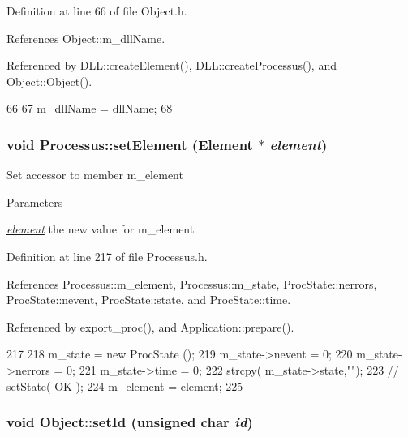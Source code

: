 Definition at line 66 of file Object.h.

References Object::m\_\-dllName.

Referenced by DLL::createElement(), DLL::createProcessus(), and Object::Object().


\begin{DoxyCode}
66                                       {
67     m_dllName = dllName;
68   }
\end{DoxyCode}
\hypertarget{classProcessus_a8ddef94227d83d9dae2cd49aebc33353}{
\subsubsection[{setElement}]{\setlength{\rightskip}{0pt plus 5cm}void Processus::setElement ({\bf Element} $\ast$ {\em element})}}
\label{classProcessus_a8ddef94227d83d9dae2cd49aebc33353}
Set accessor to member m\_\-element 
\begin{DoxyParams}{Parameters}
\item[{\em \hyperlink{namespaceelement}{element}}]the new value for m\_\-element \end{DoxyParams}


Definition at line 217 of file Processus.h.

References Processus::m\_\-element, Processus::m\_\-state, ProcState::nerrors, ProcState::nevent, ProcState::state, and ProcState::time.

Referenced by export\_\-proc(), and Application::prepare().


\begin{DoxyCode}
217                                      {
218     m_state = new ProcState ();
219     m_state->nevent  = 0;
220     m_state->nerrors = 0;
221     m_state->time    = 0;
222     strcpy( m_state->state,"");
223     //  setState( OK );
224     m_element = element;
225   }
\end{DoxyCode}
\hypertarget{classObject_a398fe08cba594a0ce6891d59fe4f159f}{
\subsubsection[{setId}]{\setlength{\rightskip}{0pt plus 5cm}void Object::setId (unsigned char {\em id})}}
\label{classObject_a398fe08cba594a0ce6891d59fe4f159f}


